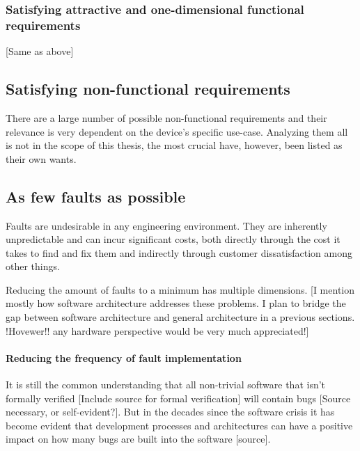 \subsubsection{Satisfying attractive and one-dimensional functional requirements}
[Same as above]

\subsection{Satisfying non-functional requirements}
There are a large number of possible non-functional requirements and their relevance is very dependent on the device's specific use-case. Analyzing them all is not in the scope of this thesis, the most crucial have, however, been listed as their own wants. 


\subsection{As few faults as possible}
Faults are undesirable in any engineering environment. They are inherently unpredictable and can incur significant costs, both directly through the cost it takes to find and fix them and indirectly through customer dissatisfaction among other things.

Reducing the amount of faults to a minimum has multiple dimensions. 
[I mention mostly how software architecture addresses these problems. I plan to bridge the gap between software architecture and general architecture in a previous sections. !Hovewer!! any hardware perspective would be very much appreciated!]
\paragraph{Reducing the frequency of fault implementation}
It is still the common understanding that all non-trivial software that isn't formally verified [Include source for formal verification] will contain bugs [Source necessary, or self-evident?]. But in the decades since the software crisis it has become evident that development processes and architectures can have a positive impact on how many bugs are built into the software [source].  
